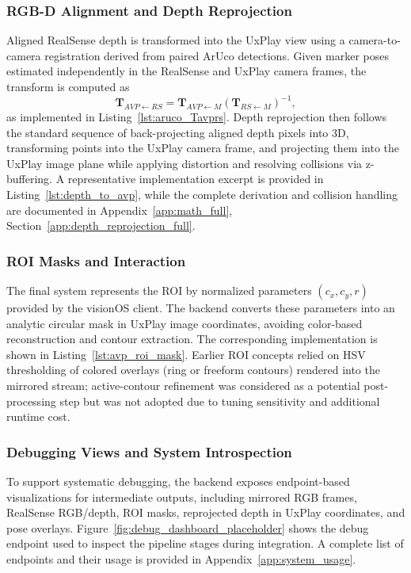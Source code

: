 \subsubsection{RGB-D Alignment and Depth Reprojection}
\label{subsec:impl_reprojection}
Aligned RealSense depth is transformed into the UxPlay view using a camera-to-camera registration derived from paired ArUco detections. Given marker poses estimated independently in the RealSense and UxPlay camera frames, the transform is computed as
\[
\mathbf{T}_{AVP \leftarrow RS} =
\mathbf{T}_{AVP \leftarrow M}\left(\mathbf{T}_{RS \leftarrow M}\right)^{-1},
\]
as implemented in Listing~\ref{lst:aruco_Tavprs}. Depth reprojection then follows the standard sequence of back-projecting aligned depth pixels into 3D, transforming points into the UxPlay camera frame, and projecting them into the UxPlay image plane while applying distortion and resolving collisions via z-buffering. A representative implementation excerpt is provided in Listing~\ref{lst:depth_to_avp}, while the complete derivation and collision handling are documented in Appendix~\ref{app:math_full}, Section~\ref{app:depth_reprojection_full}.

\subsubsection{ROI Masks and Interaction}
\label{subsec:impl_roi}
The final system represents the ROI by normalized parameters $(c_x,c_y,r)$ provided by the visionOS client. The backend converts these parameters into an analytic circular mask in UxPlay image coordinates, avoiding color-based reconstruction and contour extraction. The corresponding implementation is shown in Listing~\ref{lst:avp_roi_mask}. Earlier ROI concepts relied on HSV thresholding of colored overlays (ring or freeform contours) rendered into the mirrored stream; active-contour refinement was considered as a potential post-processing step but was not adopted due to tuning sensitivity and additional runtime cost.

\subsubsection{Debugging Views and System Introspection}
\label{subsec:impl_debug}
To support systematic debugging, the backend exposes endpoint-based visualizations for intermediate outputs, including mirrored RGB frames, RealSense RGB/depth, ROI masks, reprojected depth in UxPlay coordinates, and pose overlays. Figure~\ref{fig:debug_dashboard_placeholder} shows the debug endpoint used to inspect the pipeline stages during integration. A complete list of endpoints and their usage is provided in Appendix~\ref{app:system_usage}.

